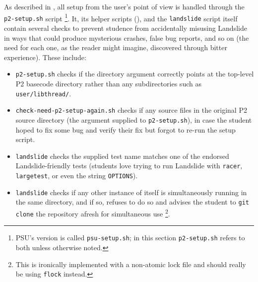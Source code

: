 As described in \sect{\ref{sec:landslide-setup}},
all setup from the user's point of view is handled through the {\tt p2-setup.sh} script%
\footnote{PSU's version is called {\tt psu-setup.sh};
in this section {\tt p2-setup.sh} refers to both unless otherwise noted.
}.
It, its helper scripts (\sect{\ref{sec:landslide-glue}}),
and the {\tt landslide} script itself contain several checks to prevent
studence
from accidentally misusing Landslide in ways that could produce mysterious crashes, false bug reports, and so on
(the need for each one, as the reader might imagine, discovered through bitter experience).
These include:
\begin{itemize}
	\item {\tt p2-setup.sh} checks if the directory argument correctly points at the top-level P2 basecode directory
		rather than any subdirectories such as {\tt user/libthread/}.
	\item {\tt check-need-p2-setup-again.sh} checks if any source files in the original P2 source directory
		(the argument supplied to {\tt p2-setup.sh}),
		in case the student hoped to fix some bug and verify their fix but forgot to re-run the setup script.
	\item {\tt landslide} checks the supplied test name matches one of the endorsed Landslide-friendly tests
		(students love trying to run Landslide with {\tt racer}, {\tt largetest},
		or even the string {\tt OPTIONS}).
	\item {\tt landslide} checks if any other instance of itself is simultaneously running in the same directory,
		and if so, refuses to do so and advises the student
		to {\tt git clone} the repository afresh for simultaneous use%
		\footnote{This is ironically implemented with a non-atomic lock file
		and should really be using {\tt flock} instead.
		}.
\end{itemize}
\vspace{1em}

